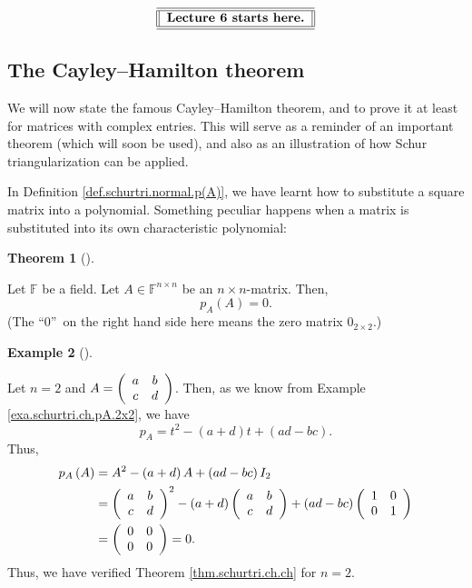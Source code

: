 \documentclass[numbers=enddot,12pt,final,onecolumn,notitlepage]{scrartcl}%
\numberwithin{exer}{subsection}
\theoremstyle{definition}
\newtheorem{theo}{Theorem}[subsection]
\newenvironment{theorem}[1][]
{\begin{theo}[#1]\begin{leftbar}}
{\end{leftbar}\end{theo}}
\newtheorem{exam}[theo]{Example}
\newenvironment{example}[1][]
{\begin{exam}[#1]\begin{leftbar}}
{\end{leftbar}\end{exam}}
\begin{document}
%

\[%
\begin{tabular}
[c]{||l||}\hline\hline
\textbf{Lecture 6 starts here.}\\\hline\hline
\end{tabular}
\]


\subsection{The Cayley--Hamilton theorem}

We will now state the famous Cayley--Hamilton theorem, and to prove it at
least for matrices with complex entries. This will serve as a reminder of an
important theorem (which will soon be used), and also as an illustration of
how Schur triangularization can be applied.

In Definition \ref{def.schurtri.normal.p(A)}, we have learnt how to substitute
a square matrix into a polynomial. Something peculiar happens when a matrix is
substituted into its own characteristic polynomial:

\begin{theorem}
[Cayley--Hamilton theorem]\label{thm.schurtri.ch.ch}Let $\mathbb{F}$ be a
field. Let $A\in\mathbb{F}^{n\times n}$ be an $n\times n$-matrix. Then,%
\[
p_{A}\left(  A\right)  =0.
\]
(The \textquotedblleft$0$\textquotedblright\ on the right hand side here means
the zero matrix $0_{2\times2}$.)
\end{theorem}

\begin{example}
Let $n=2$ and $A=\left(
\begin{array}
[c]{cc}%
a & b\\
c & d
\end{array}
\right)  $. Then, as we know from Example \ref{exa.schurtri.ch.pA.2x2}, we
have%
\[
p_{A}=t^{2}-\left(  a+d\right)  t+\left(  ad-bc\right)  .
\]
Thus,%
\begin{align*}
p_{A}\left(  A\right)   &  =A^{2}-\left(  a+d\right)  A+\left(  ad-bc\right)
I_{2}\\
&  =\left(
\begin{array}
[c]{cc}%
a & b\\
c & d
\end{array}
\right)  ^{2}-\left(  a+d\right)  \left(
\begin{array}
[c]{cc}%
a & b\\
c & d
\end{array}
\right)  +\left(  ad-bc\right)  \left(
\begin{array}
[c]{cc}%
1 & 0\\
0 & 1
\end{array}
\right) \\
&  =\left(
\begin{array}
[c]{cc}%
0 & 0\\
0 & 0
\end{array}
\right)  =0.
\end{align*}
Thus, we have verified Theorem \ref{thm.schurtri.ch.ch} for $n=2$.
\end{example}
\end{document}
